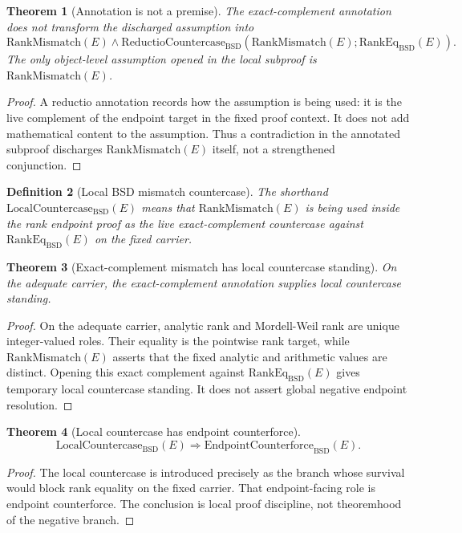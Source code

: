 \documentclass[11pt]{article}
\newtheorem{theorem}{Theorem}[section]
\newtheorem{definition}[theorem]{Definition}
\newcommand{\BSD}{\mathrm{BSD}}
\newcommand{\RankMismatch}{\mathrm{RankMismatch}}
\newcommand{\RankEq}{\mathrm{RankEq}_{\BSD}}
\newcommand{\ReductioBSD}{\mathrm{ReductioCountercase}_{\BSD}}
\newcommand{\LocalCountercaseBSD}{\mathrm{LocalCountercase}_{\BSD}}
\newcommand{\EndpointCounterforceBSD}{\mathrm{EndpointCounterforce}_{\BSD}}
\begin{document}
\begin{theorem}[Annotation is not a premise]\label{thm:rank-annotation-not-premise}
The exact-complement annotation does not transform the discharged assumption into
\[
\RankMismatch(E)\wedge \ReductioBSD(\RankMismatch(E);\RankEq(E)).
\]
The only object-level assumption opened in the local subproof is $\RankMismatch(E)$.
\end{theorem}

\begin{proof}
A reductio annotation records how the assumption is being used: it is the live complement of the endpoint target in the fixed proof context. It does not add mathematical content to the assumption. Thus a contradiction in the annotated subproof discharges $\RankMismatch(E)$ itself, not a strengthened conjunction.
\end{proof}

\begin{definition}[Local BSD mismatch countercase]
The shorthand $\LocalCountercaseBSD(E)$ means that $\RankMismatch(E)$ is being used inside the rank endpoint proof as the live exact-complement countercase against $\RankEq(E)$ on the fixed carrier.
\end{definition}

\begin{theorem}[Exact-complement mismatch has local countercase standing]\label{thm:rank-mismatch-local-countercase}
On the adequate carrier, the exact-complement annotation supplies local countercase standing.
\end{theorem}

\begin{proof}
On the adequate carrier, analytic rank and Mordell-Weil rank are unique integer-valued roles. Their equality is the pointwise rank target, while $\RankMismatch(E)$ asserts that the fixed analytic and arithmetic values are distinct. Opening this exact complement against $\RankEq(E)$ gives temporary local countercase standing. It does not assert global negative endpoint resolution.
\end{proof}

\begin{theorem}[Local countercase has endpoint counterforce]\label{thm:local-countercase-counterforce}
\[
\LocalCountercaseBSD(E)
\Rightarrow
\EndpointCounterforceBSD(E).
\]
\end{theorem}

\begin{proof}
The local countercase is introduced precisely as the branch whose survival would block rank equality on the fixed carrier. That endpoint-facing role is endpoint counterforce. The conclusion is local proof discipline, not theoremhood of the negative branch.
\end{proof}
\end{document}
